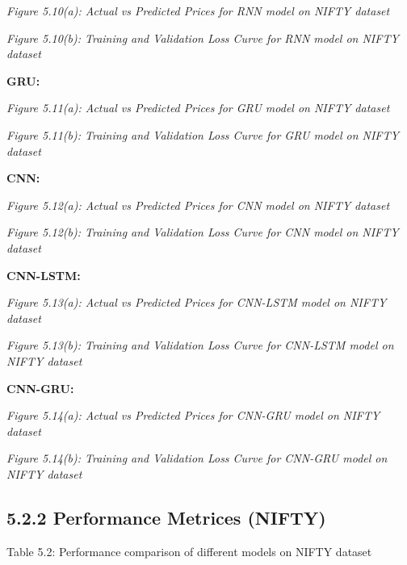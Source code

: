 \documentclass[12pt,a4paper]{report}
\begin{document}
\begin{center}
\textit{Figure 5.10(a): Actual vs Predicted Prices for RNN model on NIFTY dataset}
\end{center}
\begin{center}
\textit{Figure 5.10(b): Training and Validation Loss Curve for RNN model on NIFTY data}\textit{set}
\end{center}
\textbf{GRU:}

\begin{center}
\textit{Figure 5.11(a): Actual vs Predicted Prices for GRU model on NIFTY dataset}
\end{center}
\begin{center}
\textit{Figure 5.11(b): Training and Validation Loss Curve for GRU model on NIFTY data}\textit{set}
\end{center}
\textbf{CNN:}

\begin{center}
\textit{Figure 5.12(a): Actual vs Predicted Prices for CNN model on NIFTY dataset}
\end{center}
\begin{center}
\textit{Figure 5.12(b): Training and Validation Loss Curve for CNN model on NIFTY data}\textit{set}
\end{center}
\textbf{CNN-LSTM:}

\begin{center}
\textit{Figure 5.13(a): Actual vs Predicted Prices for CNN-LSTM model on NIFTY dataset}
\end{center}
\begin{center}
\textit{Figure 5.13(b): Training and Validation Loss Curve for CNN-LSTM model on NIFTY data}\textit{set}
\end{center}
\textbf{CNN-GRU:}

\begin{center}
\textit{Figure 5.14(a): Actual vs Predicted Prices for CNN-GRU model on NIFTY dataset}
\end{center}
\begin{center}
\textit{Figure 5.14(b): Training and Validation Loss Curve for CNN-GRU model on NIFTY data}\textit{set}
\end{center}
\subsection{5.2.2 Performance Metrices (NIFTY)}
Table 5.2: Performance comparison of different models on NIFTY dataset
\end{document}
